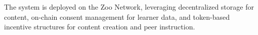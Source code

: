 The system is deployed on the Zoo Network, leveraging decentralized storage for content, on-chain consent management for learner data, and token-based incentive structures for content creation and peer instruction.

